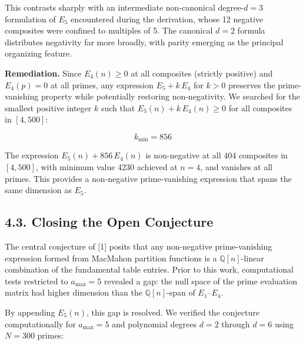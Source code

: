 \documentclass[
  11pt,
]{article}
\begin{document}
This contrasts sharply with an intermediate non-canonical degree-\(d=3\)
formulation of \(E_5\) encountered during the derivation, whose 12
negative composites were confined to multiples of 5. The canonical
\(d=2\) formula distributes negativity far more broadly, with parity
emerging as the principal organizing feature.

\textbf{Remediation.} Since \(E_4(n) \geq 0\) at all composites
(strictly positive) and \(E_4(p) = 0\) at all primes, any expression
\(E_5 + k\,E_4\) for \(k > 0\) preserves the prime-vanishing property
while potentially restoring non-negativity. We searched for the smallest
positive integer \(k\) such that \(E_5(n) + k\,E_4(n) \geq 0\) for all
composites in \([4, 500]\):

\[k_{\min} = 856\]

The expression \(E_5(n) + 856\,E_4(n)\) is non-negative at all 404
composites in \([4,500]\), with minimum value 4230 achieved at
\(n = 4\), and vanishes at all primes. This provides a non-negative
prime-vanishing expression that spans the same dimension as \(E_5\).

\subsection{4.3. Closing the Open
Conjecture}\label{closing-the-open-conjecture}

The central conjecture of {[}1{]} posits that any non-negative
prime-vanishing expression formed from MacMahon partition functions is a
\(\mathbb{Q}[n]\)-linear combination of the fundamental table entries.
Prior to this work, computational tests restricted to \(a_{\max} = 5\)
revealed a gap: the null space of the prime evaluation matrix had higher
dimension than the \(\mathbb{Q}[n]\)-span of \(E_1\)--\(E_4\).

By appending \(E_5(n)\), this gap is resolved. We verified the
conjecture computationally for \(a_{\max} = 5\) and polynomial degrees
\(d = 2\) through \(d = 6\) using \(N = 300\) primes:
\end{document}
